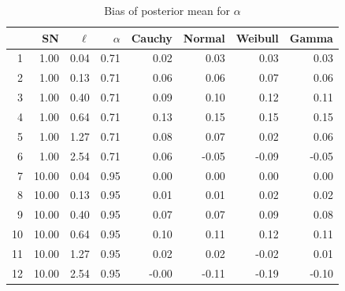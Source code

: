 \documentclass{article}
\begin{document}
\begin{table}[htbp]
\centering
\caption {Bias of posterior mean for $\alpha$} \label{bias_alpha} 
\begin{tabular}{rrrrrrrr}
  \hline
 & SN & $\ell$ & $\alpha$ & Cauchy & Normal & Weibull & Gamma \\ 
  \hline
1 & 1.00 & 0.04 & 0.71 & 0.02 & 0.03 & 0.03 & 0.03 \\ 
  2 & 1.00 & 0.13 & 0.71 & 0.06 & 0.06 & 0.07 & 0.06 \\ 
  3 & 1.00 & 0.40 & 0.71 & 0.09 & 0.10 & 0.12 & 0.11 \\ 
  4 & 1.00 & 0.64 & 0.71 & 0.13 & 0.15 & 0.15 & 0.15 \\ 
  5 & 1.00 & 1.27 & 0.71 & 0.08 & 0.07 & 0.02 & 0.06 \\ 
  6 & 1.00 & 2.54 & 0.71 & 0.06 & -0.05 & -0.09 & -0.05 \\ 
  7 & 10.00 & 0.04 & 0.95 & 0.00 & 0.00 & 0.00 & 0.00 \\ 
  8 & 10.00 & 0.13 & 0.95 & 0.01 & 0.01 & 0.02 & 0.02 \\ 
  9 & 10.00 & 0.40 & 0.95 & 0.07 & 0.07 & 0.09 & 0.08 \\ 
  10 & 10.00 & 0.64 & 0.95 & 0.10 & 0.11 & 0.12 & 0.11 \\ 
  11 & 10.00 & 1.27 & 0.95 & 0.02 & 0.02 & -0.02 & 0.01 \\ 
  12 & 10.00 & 2.54 & 0.95 & -0.00 & -0.11 & -0.19 & -0.10 \\ 
   \hline
\end{tabular}
\end{table}
\end{document}

